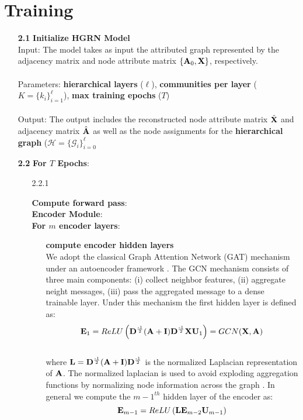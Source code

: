 \documentclass[a4paper,12pt]{article}
\newcommand{\forceindent}{\leavevmode{\parindent=2em\indent}}
\begin{document}
	\section{Training}
	\begin{itemize}
	\item[\bf 2.1]{\textbf{Initialize HGRN Model} \\
		Input: The model takes as input the attributed graph represented by the adjacency matrix and node attribute matrix $\{{\bf A}_0, {\bf X}\}$, respectively. \\
		\\
		Parameters: \textbf{hierarchical layers} ($\ell$), \textbf{communities per layer} ($K =\{k_i\}_{i=1}^\ell$), \textbf{max training epochs} ($T$) \\
		\\
		Output: The output includes the reconstructed node attribute matrix $\hat{\bf X}$ and adjacency matrix $\hat{\bf A}$ as well as the node assignments for the \textbf{hierarchical graph} ($\mathcal{H} = \{\mathcal{G}_i\}_{i = 0}^\ell$
	}

	\item[\bf 2.2]{\textbf{For $T$ Epochs}:}
		\begin{enumerate}
			\item[2.2.1]{\textbf{Compute forward pass}: \\
			
			 \forceindent \textbf{Encoder Module}: \\
			 \forceindent \textbf{For $m$ encoder layers}: 
			\begin{enumerate}
				\item[]{\textbf{compute encoder hidden layers} \\
					We adopt the classical Graph Attention Network (GAT) mechanism under an autoencoder framework \cite{}. The GCN mechanism consists of three main components: (i) collect neighbor features, (ii) aggregate neight messages, (iii) pass the aggregated message to a dense trainable layer. Under this mechanism the first hidden layer is defined as: 
					\[{\bf E}_1 = ReLU\left({\bf D}^{\frac{\text{-1}}{2}} ({\bf A}+{\bf I}) {\bf D}^{\frac{\text{-1}}{2}}{\bf X}{\bf U}_{1}\right) = GCN({\bf X},{\bf A})\]
					\\
					where $\mathit{\bf L} = {\bf D}^{\frac{\text{-1}}{2}} ({\bf A}+{\bf I}) {\bf D}^{\frac{\text{-1}}{2}}$ is the normalized Laplacian representation of ${\bf A}$. The normalized laplacian is used to avoid exploding aggregation functions by normalizing node information across the graph \cite{zhang2019graph}. In general we compute the $m-1^{th}$ hidden layer of the encoder as:
					\[{\bf E}_{m-1} = ReLU\left(\mathit{\bf L}{\bf E}_{m-2}{\bf U}_{m-1}\right)\]
					}
				

\end{enumerate}}
\end{enumerate}
\end{itemize}
\end{document}

